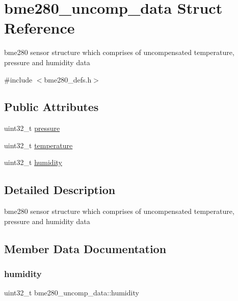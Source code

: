 \hypertarget{structbme280__uncomp__data}{}\section{bme280\+\_\+uncomp\+\_\+data Struct Reference}
\label{structbme280__uncomp__data}


bme280 sensor structure which comprises of uncompensated temperature, pressure and humidity data  




{\ttfamily \#include $<$bme280\+\_\+defs.\+h$>$}

\subsection*{Public Attributes}
\begin{DoxyCompactItemize}
\item 
uint32\+\_\+t \hyperlink{structbme280__uncomp__data_afa4d1b43f8412d393dcc5fd41f4203ce}{pressure}
\item 
uint32\+\_\+t \hyperlink{structbme280__uncomp__data_a0ae24e11ffef8390b948b53ba4dbb652}{temperature}
\item 
uint32\+\_\+t \hyperlink{structbme280__uncomp__data_a31e311e6fc9a49e8159a81017a7393a1}{humidity}
\end{DoxyCompactItemize}


\subsection{Detailed Description}
bme280 sensor structure which comprises of uncompensated temperature, pressure and humidity data 

\subsection{Member Data Documentation}
\mbox{\label{structbme280__uncomp__data_a31e311e6fc9a49e8159a81017a7393a1}} 
\subsubsection{\texorpdfstring{humidity}{humidity}}
{\footnotesize\ttfamily uint32\+\_\+t bme280\+\_\+uncomp\+\_\+data\+::humidity}

